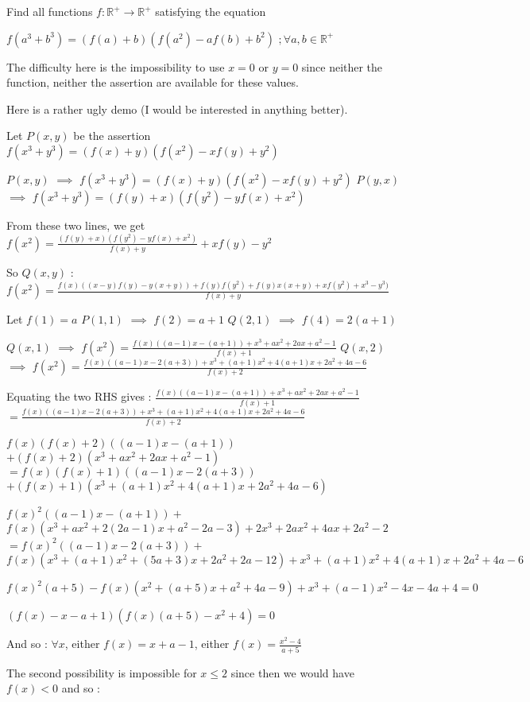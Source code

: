 \begin{solution}
	\begin{tcolorbox}Find all functions $ f: \mathbb{R^ + } \to \mathbb{R^ + }$ satisfying the equation

$ f(a^3 + b^3) = (f(a) + b)(f(a^2) - af(b) + b^2)$ $ ;$$ \forall a,b \in \mathbb{R}^ +$\end{tcolorbox}

The difficulty here is the impossibility to use $ x=0$ or $ y=0$ since neither the function, neither the assertion are available for these values.

Here is a rather ugly demo (I would be interested in anything better).

Let $ P(x,y)$ be the assertion $ f(x^3+y^3)=(f(x)+y)(f(x^2)-xf(y)+y^2)$

$ P(x,y)$ $ \implies$ $ f(x^3+y^3)=(f(x)+y)(f(x^2)-xf(y)+y^2)$
$ P(y,x)$ $ \implies$ $ f(x^3+y^3)=(f(y)+x)(f(y^2)-yf(x)+x^2)$

From these two lines, we get $ f(x^2)=\frac{(f(y)+x)(f(y^2)-yf(x)+x^2)}{f(x)+y}+xf(y)-y^2$

So $ Q(x,y)$ : $ f(x^2)=\frac{f(x)((x-y)f(y)-y(x+y))+f(y)f(y^2)+f(y)x(x+y)+xf(y^2)+x^3-y^3)}{f(x)+y}$

Let $ f(1)=a$
$ P(1,1)$ $ \implies$ $ f(2)=a+1$
$ Q(2,1)$ $ \implies$ $ f(4)=2(a+1)$

$ Q(x,1)$ $ \implies$ $ f(x^2)=\frac{f(x)((a-1)x-(a+1))+x^3+ax^2+2ax+a^2-1}{f(x)+1}$
$ Q(x,2)$ $ \implies$ $ f(x^2)=\frac{f(x)((a-1)x-2(a+3))+x^3+(a+1)x^2+4(a+1)x+2a^2+4a-6}{f(x)+2}$

Equating the two RHS gives :
$ \frac{f(x)((a-1)x-(a+1))+x^3+ax^2+2ax+a^2-1}{f(x)+1}$ $ =\frac{f(x)((a-1)x-2(a+3))+x^3+(a+1)x^2+4(a+1)x+2a^2+4a-6}{f(x)+2}$

$ f(x)(f(x)+2)((a-1)x-(a+1))$ $ +(f(x)+2)(x^3+ax^2+2ax+a^2-1)$ $ =f(x)(f(x)+1)((a-1)x-2(a+3))$ $ +(f(x)+1)(x^3+(a+1)x^2+4(a+1)x+2a^2+4a-6)$

$ f(x)^2((a-1)x-(a+1))+$ $ f(x)(x^3+ax^2+2(2a-1)x+a^2-2a-3)+2x^3+2ax^2+4ax+2a^2-2$ $ =f(x)^2((a-1)x-2(a+3))+$ $ f(x)(x^3+(a+1)x^2+(5a+3)x+2a^2+2a-12)+x^3+(a+1)x^2+4(a+1)x+2a^2+4a-6$

$ f(x)^2(a+5)-f(x)(x^2+(a+5)x+a^2+4a-9)+x^3+(a-1)x^2-4x-4a+4=0$

$ (f(x)-x-a+1)(f(x)(a+5)-x^2+4)=0$

And so : $ \forall x$, either $ f(x)=x+a-1$, either $ f(x)=\frac{x^2-4}{a+5}$

The second possibility is impossible for $ x\leq 2$ since then we would have $ f(x)<0$ and so :


\end{solution}

